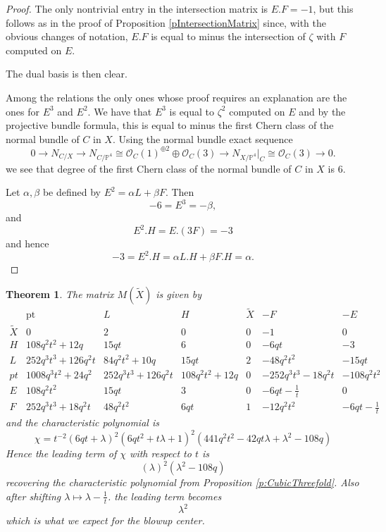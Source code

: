 \documentclass[11pt]{amsart}
\theoremstyle{plain}
\newtheorem{theorem}{Theorem}[section]
\numberwithin{equation}{section}
\theoremstyle{definition}
\theoremstyle{remark}
\begin{document}
\begin{proof}
The only nontrivial entry in the intersection matrix is $E.F =-1$, but this follows as in the proof of Proposition \ref{pIntersectionMatrix} since, with the obvious changes of notation, $E.F$ is equal to minus the intersection of $\zeta$ with $F$ computed on $E$. 

The dual basis is then clear. 

Among the relations the only ones whose proof requires an explanation are the ones for $E^3$ and $E^2$. We have that $E^3$ is equal to $\zeta^2$ computed on $E$ and by the projective bundle formula, this is equal to minus the first Chern class of the normal bundle of $C$ in $X$. 
Using the normal bundle exact sequence
\[
0 \longrightarrow N_{C/X} \longrightarrow N_{C/\mathbb P^4}\cong \mathcal O_C(1)^{\oplus 2} \oplus \mathcal{O}_C (3)
\longrightarrow N_{X/\mathbb P^4}\big|_C \cong \mathcal O_C(3) \longrightarrow 0 .
\]
we see that degree of the first Chern class of the normal bundle of $C$ in $X$ is $6$.

Let $\alpha, \beta$ be defined by $E^2 = \alpha L + \beta F$. Then 
\[
- 6 =E^3 = - \beta, 
\]
and
\[
E^2.H = E. (3F) = -3
\]
and hence
\[
-3 = E^2.H = \alpha L .H + \beta F.H = \alpha .
\]
\end{proof}


\begin{theorem}\label{tBlowupInEllipticCurve}
The matrix $M(\widetilde{X})$ is given by 
\[
\begin{array}{c|cccc|cc}
      & \mathrm{pt} & L & H & \widetilde{X} & -F & -E \\ 
      \hline
       \widetilde{X} &0&2&0&0&-1&0\\
      H &108q^{2}t^{2}+12q&15qt&6&0&-6qt&-3\\
      L & 252q^{3}t^{3}+126q^{2}t&84q^{2}t^{2}+10q&15qt&2&-48q^{2}t^{2}&-15qt\\
      pt & 1008q^{3}t^{2}+24q^{2}&252q^{3}t^{3}+126q^{2}t&108q^{2}t^{2}+12q&0&-252q^{3}t^{3}-18q^{2}t&-108q^{2}t^{2}\\ 
      \hline
      E &108q^{2}t^{2}&15qt&3&0& -6qt-\frac{1}{t}  &0\\
      F & 252q^{3}t^{3}+18q^{2}t&48q^{2}t^{2}&6qt&1&-12q^{2}t^{2}& -6qt-\frac{1}{t}  
      \end{array}
\]
and the characteristic polynomial is
\[
\chi = t^{-2}
\left(6qt+\lambda\right)^{2}
\left(6qt^{2}+t\lambda+1\right)^{2}
\left(441q^{2}t^{2}-42qt\lambda+\lambda^{2}-108q\right)
\]
Hence the leading term of $\chi$ with respect to $t$ is
\[
\left(\lambda\right)^{2}
\left(\lambda^{2}-108q\right)
\]
recovering the characteristic polynomial from Proposition \ref{p:CubicThreefold}. Also after shifting $\lambda \mapsto \lambda - \frac{1}{t}$. the leading term becomes
\[
\lambda^2
\]
which is what we expect for the blowup center.

\end{theorem}
\end{document}
